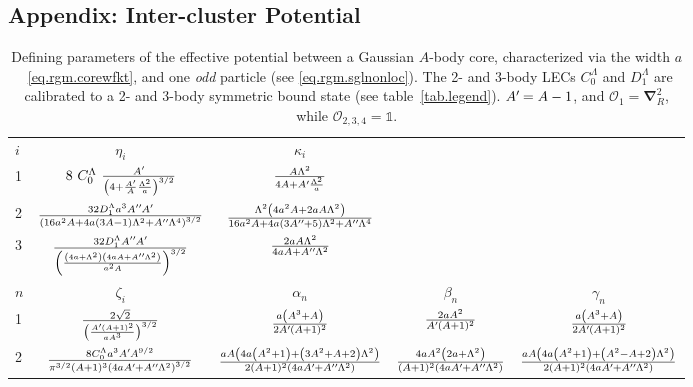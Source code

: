 \documentclass[aps,nofootinbib,prl,showpacs,twocolumn,groupedaddress,superscriptaddress]
{revtex4}
\newcommand*{\mprime}{^{\prime}\mkern-1.2mu}
\newcommand*{\mdprime}{^{\prime\prime}\mkern-1.2mu}
\newcommand{\ve}[1]{\ensuremath{\boldsymbol{#1}}}
\begin{document}
\begin{widetext}
\begin{turnpage}
\section{Appendix: Inter-cluster Potential}
\begin{table}
\setlength{\tabcolsep}{4pt}
\renewcommand{\arraystretch}{2.4}
\caption{\label{tab.rgmpot}{Defining parameters of the effective potential between
a Gaussian $A$-body core, characterized via the width $a$~\eqref{eq.rgm.corewfkt},
and one {\it odd} particle (see \eqref{eq.rgm.sglnonloc}).
The 2- and 3-body LECs $C^\Lambda_0$ and $D^\Lambda_1$ are
calibrated to a 2- and 3-body symmetric bound state (see table~\ref{tab.legend}). $A\mprime=A-1$, and
$\mathcal{O}_1=\ve{\nabla}_R^2$, while $\mathcal{O}_{2,3,4}=\mathbb{1}$.}}
\small\centering
\begin{tabular}{lc|ccc}
\hline\hline
$i$ & $\eta_i$ & $\kappa_i$ & & \\
1   & $8~C_0^\Lambda~\frac{A\mprime}{\left(4+\frac{A\mprime}{A}\frac{\Lambda^2}{a}\right)^{3/2}}$  & $\frac{A\Lambda^2}{4A+A\mprime\frac{\Lambda^2}{a}}$ \\
2   & $
\frac{32 D_1^\Lambda a^3 A\mdprime A\mprime}{\left(16 a^2 A+4 a (3 A-1) \Lambda ^2+A\mdprime \Lambda ^4\right)^{3/2}}$ & $\frac{\Lambda ^2 \left(4 a^2 A+2 a A \Lambda ^2\right)}{16 a^2 A+4 a (3 A\mdprime+5) \Lambda ^2+A\mdprime \Lambda ^4}$ \\
3 & 
$\frac{32 D_1^\Lambda A\mdprime A\mprime}{\left(\frac{\left(4 a+\Lambda ^2\right) \left(4 a A+A\mdprime \Lambda ^2\right)}{a^2 A}\right)^{3/2}}$ & $\frac{2 a A \Lambda ^2}{4 a A+A\mdprime \Lambda ^2}$ \\
\hline
$n$ & $\zeta_i$ & $\alpha_n$ & $\beta_n$ & $\gamma_n$ \\
1 &$\frac{2 \sqrt{2}}{\left(\frac{A\mprime (A+1)^2}{a A^3}\right)^{3/2}}$&
$\frac{a \left(A^3+A\right)}{2 A\mprime (A+1)^2}$&
$\frac{2 a A^2}{A\mprime (A+1)^2}$&
$\frac{a \left(A^3+A\right)}{2 A\mprime (A+1)^2}$\\
2 & 
$ \frac{8 C_0^\Lambda a^3 A\mprime A^{9/2}}{\pi ^{3/2} (A+1)^3 \left(4 a A\mprime+A\mdprime \Lambda ^2\right)^{3/2}}  $ & 
$\frac{\text{} a A \left(4 a \left(A^2+1\right)+\left(3 A^2+A+2\right) \Lambda ^2\right)}{2 (A+1)^2 \left(4 a A\mprime+A\mdprime \Lambda ^2\right)}$&
$\frac{4 \text{} a A^2 \left(2 a+\Lambda ^2\right)}{(A+1)^2 \left(4 a A\mprime+A\mdprime \Lambda ^2\right)}$&
$\frac{a A \left(4 a \left(A^2+1\right)+\left(A^2-A+2\right) \Lambda ^2\right)}{2 (A+1)^2 \left(4 a A\mprime+A\mdprime \Lambda ^2\right)}$ \\

\end{tabular}
\end{table}
\end{turnpage}
\end{widetext}
\end{document}
